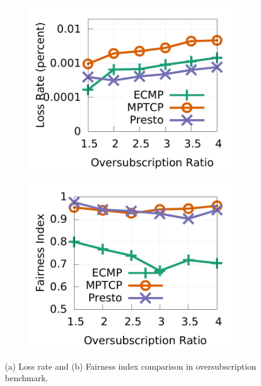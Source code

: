 \begin{figure}[!t]
        \centering
	\centering
        \begin{subfigure}[b]{0.45\textwidth}
                \centering
		\includegraphics[width=\textwidth]{presto/figures/congestion_test/congestion_compare_loss.pdf}
		\caption{}
		\label{micro_congestion_test_loss}
	\end{subfigure}
	\begin{subfigure}[b]{0.45\textwidth}
		\centering
  		\includegraphics[width=\textwidth]{presto/figures/congestion_test/congestion_compare_fairness.pdf}
		\caption{}
        \label{micro_congestion_test_fairness}
	\end{subfigure}
	\caption{(a) Loss rate and (b) Fairness index comparison in oversubscription benchmark.}
\end{figure}

